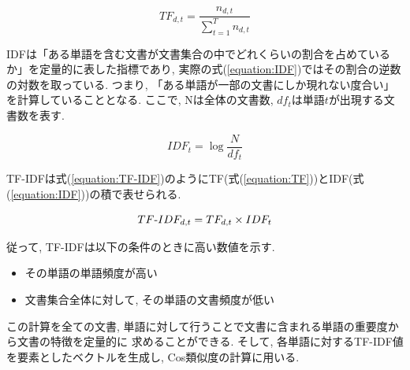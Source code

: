 \documentclass{ltjarticle}
\begin{document}
\begin{equation}
    TF_{d,t} = \dfrac{n_{d,t}}{\sum_{t=1}^T n_{d,t}}
    \label{equation:TF}
\end{equation}
\vspace{5truept}

IDFは「ある単語を含む文書が文書集合の中でどれくらいの割合を占めているか」を定量的に表した指標であり, 
実際の式(\ref{equation:IDF})ではその割合の逆数の対数を取っている. つまり, 「ある単語が一部の文書にしか現れない度合い」を計算していることとなる. 
ここで, Nは全体の文書数, $df_t$は単語$t$が出現する文書数を表す. 
\vspace{5truept}

\begin{equation}
    IDF_t = \log\dfrac{N}{df_t}
    \label{equation:IDF}
\end{equation}
\vspace{5truept}

\newpage
\noindent
TF-IDFは式(\ref{equation:TF-IDF})のようにTF(式(\ref{equation:TF}))とIDF(式(\ref{equation:IDF}))の積で表せられる. 
\vspace{5truept}

\begin{equation}
    TF\mathchar`-IDF_{d,t} = TF_{d,t}\times IDF_t
    \label{equation:TF-IDF}
\end{equation}
\vspace{5truept}

\noindent
従って, TF-IDFは以下の条件のときに高い数値を示す. 
\vspace{5truept}

\begin{itemize}
    \item その単語の単語頻度が高い
    \item 文書集合全体に対して, その単語の文書頻度が低い
\end{itemize}
\vspace{5truept}

\noindent
この計算を全ての文書, 単語に対して行うことで文書に含まれる単語の重要度から文書の特徴を定量的に
求めることができる. そして, 各単語に対するTF-IDF値を要素としたベクトルを生成し, Cos類似度の計算に用いる. 
\end{document}
